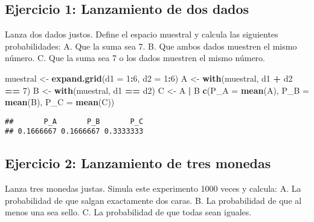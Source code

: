 \documentclass[
]{article}
\newenvironment{Shaded}{\begin{snugshade}}{\end{snugshade}}
\newcommand{\AttributeTok}[1]{\textcolor[rgb]{0.13,0.29,0.53}{#1}}
\newcommand{\DecValTok}[1]{\textcolor[rgb]{0.00,0.00,0.81}{#1}}
\newcommand{\FunctionTok}[1]{\textcolor[rgb]{0.13,0.29,0.53}{\textbf{#1}}}
\newcommand{\NormalTok}[1]{#1}
\newcommand{\OtherTok}[1]{\textcolor[rgb]{0.56,0.35,0.01}{#1}}
\newcommand{\SpecialCharTok}[1]{\textcolor[rgb]{0.81,0.36,0.00}{\textbf{#1}}}
\begin{document}
\subsection{Ejercicio 1: Lanzamiento de dos
dados}\label{ejercicio-1-lanzamiento-de-dos-dados}

Lanza dos dados justos. Define el espacio muestral y calcula las
siguientes probabilidades: A. Que la suma sea 7. B. Que ambos dados
muestren el mismo número. C. Que la suma sea 7 o los dados muestren el
mismo número.

\begin{Shaded}
\begin{Highlighting}[]
\NormalTok{muestral }\OtherTok{\textless{}{-}} \FunctionTok{expand.grid}\NormalTok{(}\AttributeTok{d1 =} \DecValTok{1}\SpecialCharTok{:}\DecValTok{6}\NormalTok{, }\AttributeTok{d2 =} \DecValTok{1}\SpecialCharTok{:}\DecValTok{6}\NormalTok{)}
\NormalTok{A }\OtherTok{\textless{}{-}} \FunctionTok{with}\NormalTok{(muestral, d1 }\SpecialCharTok{+}\NormalTok{ d2 }\SpecialCharTok{==} \DecValTok{7}\NormalTok{)}
\NormalTok{B }\OtherTok{\textless{}{-}} \FunctionTok{with}\NormalTok{(muestral, d1 }\SpecialCharTok{==}\NormalTok{ d2)}
\NormalTok{C }\OtherTok{\textless{}{-}}\NormalTok{ A }\SpecialCharTok{|}\NormalTok{ B}
\FunctionTok{c}\NormalTok{(}\AttributeTok{P\_A =} \FunctionTok{mean}\NormalTok{(A), }\AttributeTok{P\_B =} \FunctionTok{mean}\NormalTok{(B), }\AttributeTok{P\_C =} \FunctionTok{mean}\NormalTok{(C))}
\end{Highlighting}
\end{Shaded}

\begin{verbatim}
##       P_A       P_B       P_C 
## 0.1666667 0.1666667 0.3333333
\end{verbatim}

\subsection{Ejercicio 2: Lanzamiento de tres
monedas}\label{ejercicio-2-lanzamiento-de-tres-monedas}

Lanza tres monedas justas. Simula este experimento 1000 veces y calcula:
A. La probabilidad de que salgan exactamente dos caras. B. La
probabilidad de que al menos una sea sello. C. La probabilidad de que
todas sean iguales.
\end{document}

